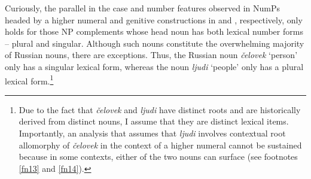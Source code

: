 \documentclass[output=paper,
modfonts,
newtxmath,
hidelinks
]{langscibook}
\begin{document}
\noindent Curiously, the parallel in the case and number features observed in NumPs headed by a higher numeral and genitive constructions in  and , respectively, only holds for those NP complements whose head noun has both lexical number forms – plural and singular. Although such nouns constitute the overwhelming majority of Russian nouns, there are exceptions. Thus, the Russian noun \textit{čelovek} ‘person’ only has a singular lexical form, whereas the noun \textit{ljudi} ‘people’ only has a plural lexical form.\footnote{\label{fn2}Due to the fact that \textit{čelovek} and \textit{ljudi} have distinct roots and are historically derived from distinct nouns, I assume that they are distinct lexical items. Importantly, an analysis that assumes that \textit{ljudi} involves contextual root allomorphy of \textit{čelovek} in the context of a higher numeral cannot be sustained because in some contexts, either of the two nouns can surface (see footnotes \ref{fn13} and \ref{fn14}).
} 
\end{document}
